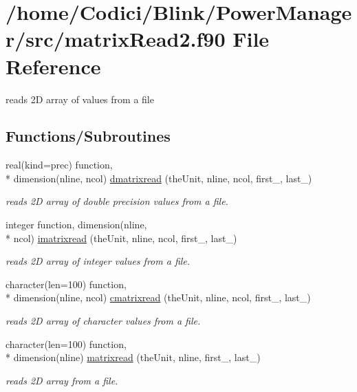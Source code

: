 \hypertarget{matrix_read2_8f90}{\section{/home/\-Codici/\-Blink/\-Power\-Manager/src/matrix\-Read2.f90 File Reference}
\label{matrix_read2_8f90}
}


reads 2\-D array of values from a file  


\subsection*{Functions/\-Subroutines}
\begin{DoxyCompactItemize}
\item 
real(kind=prec) function, \\*
dimension(nline, ncol) \hyperlink{matrix_read2_8f90_ae4323e4e0e0e6ecb1e6bc40ccb4bec64}{dmatrixread} (the\-Unit, nline, ncol, first\-\_\-, last\-\_\-)
\begin{DoxyCompactList}\small\item\em reads 2\-D array of double precision values from a file. \end{DoxyCompactList}\item 
integer function, dimension(nline, \\*
ncol) \hyperlink{matrix_read2_8f90_a9bbb90a3f70ad54afe3a0c51af1396d7}{imatrixread} (the\-Unit, nline, ncol, first\-\_\-, last\-\_\-)
\begin{DoxyCompactList}\small\item\em reads 2\-D array of integer values from a file. \end{DoxyCompactList}\item 
character(len=100) function, \\*
dimension(nline, ncol) \hyperlink{matrix_read2_8f90_abf64de424b7c068365381697e8ec0207}{cmatrixread} (the\-Unit, nline, ncol, first\-\_\-, last\-\_\-)
\begin{DoxyCompactList}\small\item\em reads 2\-D array of character values from a file. \end{DoxyCompactList}\item 
character(len=100) function, \\*
dimension(nline) \hyperlink{matrix_read2_8f90_ab6e07303536c022a24a5c1d0caffc9e4}{matrixread} (the\-Unit, nline, first\-\_\-, last\-\_\-)
\begin{DoxyCompactList}\small\item\em reads 2\-D array from a file. \end{DoxyCompactList}\end{DoxyCompactItemize}



